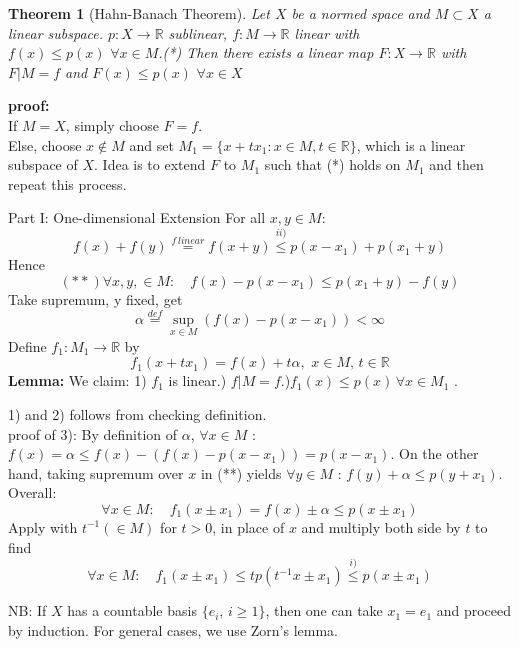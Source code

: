\documentclass{article}
\newcommand{\nextline}{\hfill\break}
\newcommand{\func}[3]{\({#1}:{#2}\xrightarrow{}{#3}\)}
\newcommand{\real}{\mathbb{R}}
\newtheorem{theorem}[example]{Theorem}
\begin{document}
\begin{theorem}[Hahn-Banach Theorem]\rm\nextline
    Let \(X\) be a normed space and \(M\subset X\) a linear subspace. \func{p}{X}{\real} sublinear, \func{f}{M}{\real} linear with 
    \(f(x)\leq p(x)\,\,\forall x\in M\).(*)
    Then there exists a linear map \func{F}{X}{\real} with \(F|M=f\) and \(F(x)\leq p(x)\,\,\forall x\in X\)
\end{theorem}
\textbf{proof:}\\
    If \(M=X\), simply choose \(F=f\).\\
    Else, choose \(x\not \in M\) and set \(M_1=\{x+tx_1:x\in M,t\in\real\}\), which is a linear subspace of \(X\). Idea is to extend \(F\) to \(M_1\) such that  (*) holds on \(M_1\) and then repeat this process.
    \begin{pf}{Part I: One-dimensional Extension}{}
    For all \(x,y\in M\):
    $$
    f(x)+f(y)
    \stackrel{f\,linear}{=}f(x+y)
    \stackrel{ii)}{\leq}p(x-x_1)+p(x_1+y)
    $$
    Hence
    $$
    (**)\forall x,y,\in M:\quad f(x)-p(x-x_1)\leq p(x_1+y)-f(y)
    $$
    Take supremum, y fixed, get 
    $$
\alpha\stackrel{def}{=}\sup_{x\in M}\left(f(x)-p(x-x_1)\right)<\infty
    $$
    Define \func{f_1}{M_1}{\real} by 
    \[f_1(x+tx_1)=f(x)+t\alpha,\,\,x\in M,\,t\in \real\]
    {\bf Lemma:}
       We claim: 1) \(f_1\) is linear.) \(f|M=f\).)\(f_1(x)\leq p(x)\,\forall x\in M_1\) .

    1) and 2) follows from checking definition.\\
    proof of 3):
    By definition of \(\alpha\),  \(\forall x\in M\) : \(f(x)=\alpha\leq f(x)-(f(x)-p(x-x_1))=p(x-x_1)\). On the other hand, taking supremum over \(x\) in (**) yields \(\forall y \in M\) : \(f(y)+\alpha\leq p(y+x_1)\). Overall:
    $$
    \forall x\in M:\quad f_1(x\pm x_1)=f(x)\pm \alpha\leq p(x\pm x_1)
    $$
    Apply with \(t^{-1}(\in M)\) for \(t>0\), in place of \(x\) and multiply both side by \(t\) to find
    $$
    \forall x\in M:\quad f_1(x\pm x_1)\leq  tp(t^{-1}x\pm x_1)\stackrel{i)}{\leq}{p(x\pm x_1)}
    $$

    NB: If \(X\) has a countable basis \(\{e_i,\,i\geq 1\}\), then one can take \(x_1=e_1\) and proceed by induction. For general cases, we use Zorn's lemma.
    
    \end{pf}
\end{document}
